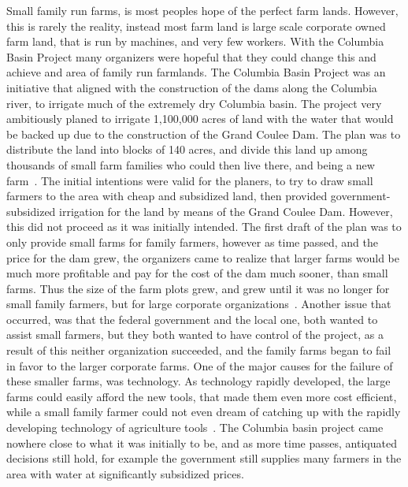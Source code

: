 \documentclass[12pt,twoside]{article}
\begin{document}
Small family run farms, is most peoples hope of the perfect farm lands.
However, this is rarely the reality, instead most farm land is large scale
corporate owned farm land, that is run by machines, and very few workers. With
the Columbia Basin Project many organizers were hopeful that they could change
this and achieve and area of family run farmlands. The Columbia Basin Project
was an initiative that aligned with the construction of the dams along the
Columbia river, to irrigate much of the extremely dry Columbia basin. The
project very ambitiously planed to irrigate 1,100,000 acres of land with the
water that would be backed up due to the construction of the Grand Coulee Dam.
The plan was to distribute the land into blocks of 140 acres, and divide this
land up among thousands of small farm families who could then live there, and
being a new farm~\cite{GCD_CBP}. The initial intentions were valid for the
planers, to try to draw small farmers to the area with cheap and subsidized
land, then provided government-subsidized irrigation for the land by means of
the Grand Coulee Dam. However, this did not proceed as it was initially
intended. The first draft of the plan was to only provide small farms for
family farmers, however as time passed, and the price for the dam grew, the
organizers came to realize that larger farms would be much more profitable and
pay for the cost of the dam much sooner, than small farms. Thus the size of the
farm plots grew, and grew until it was no longer for small family farmers, but
for large corporate organizations~\cite{CBP}. Another issue that occurred, was
that the federal government and the local one, both wanted to assist small
farmers, but they both wanted to have control of the project, as a result of
this neither organization succeeded, and the family farms began to fail in
favor to the larger corporate farms. One of the major causes for the failure of
these smaller farms, was technology. As technology rapidly developed, the large
farms could easily afford the new tools, that made them even more cost
efficient, while a small family farmer could not even dream of catching up with
the rapidly developing technology of agriculture tools~\cite{CBP}. The Columbia
basin project came nowhere close to what it was initially to be, and as more
time passes, antiquated decisions still hold, for example the government still
supplies many farmers in the area with water at significantly subsidized
prices.
\end{document}
